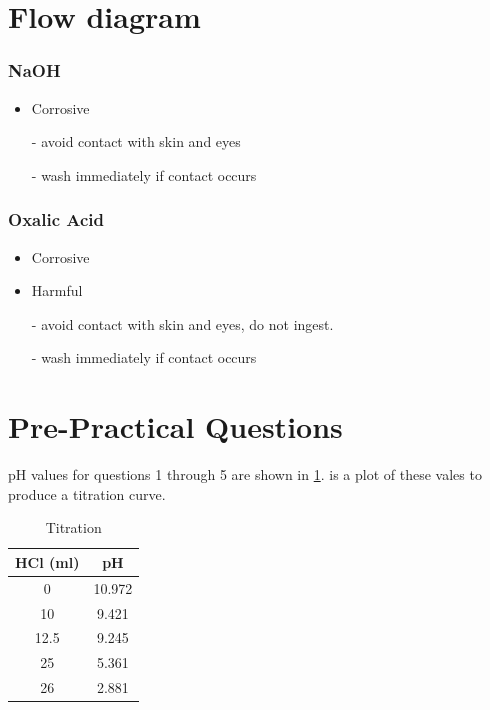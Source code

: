 \documentclass[a4paper, british]{article}
\begin{document}
\begin{appendices}
    \section{Flow diagram}

    \begin{center}
        \begin{adjustbox}{max width=\textwidth}
            
        \end{adjustbox}
    \end{center}

    \subsubsection*{NaOH}
    \begin{itemize}
        \item Corrosive
        \item[-] avoid contact with skin and eyes
        \item[-] wash immediately if contact occurs
      \end{itemize}

      \subsubsection*{Oxalic Acid}
      \begin{itemize}
          \item Corrosive
          \item Harmful
          \item[-] avoid contact with skin and eyes, do not ingest.
          \item[-] wash immediately if contact occurs
        \end{itemize}

    \newpage

    \section{Pre-Practical Questions}

  pH values for questions 1 through 5 are shown in \cref{table:titration}.  is a plot of these vales to produce a titration curve.

    \begin{table}[htb]
        \centering
        \caption{Titration}
        \begin{tabular}{cc}
            \addlinespace
            \toprule
            HCl (ml) & pH \\ 
            \midrule
            0 & 10.972 \\
            10 & 9.421 \\
            12.5 & 9.245 \\
            25 & 5.361 \\
            26 & 2.881 \\ 
            \bottomrule
            \end{tabular}
            \label{table:titration}   
    \end{table}


\end{appendices}
\end{document}
